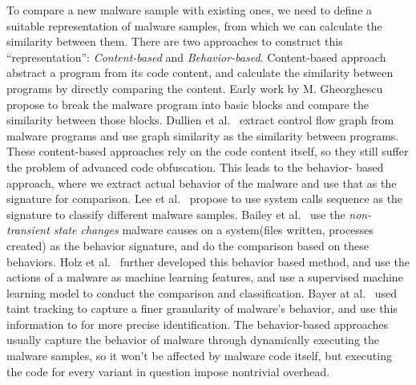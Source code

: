 To compare a new malware sample with existing ones, we need to define a 
suitable representation of malware samples, from which we can calculate 
the similarity between them. There are two approaches to construct this 
``representation'': \textit{Content-based} and \textit{Behavior-based}. 
Content-based approach abstract a program from its code content, and 
calculate the similarity between programs by directly comparing the 
content. Early work by M. Gheorghescu~\cite{Gheorghescu2006ANAV} propose 
to break the malware program into basic blocks and compare the similarity 
between those blocks.
Dullien et al.~\cite{dullien2005graph} extract control flow graph from 
malware programs and use graph similarity as the similarity between programs.
These content-based approaches rely on the code content itself, so they still
suffer the problem of advanced code obfuscation. This leads to the behavior-
based approach, where we extract actual behavior of the malware and use that
as the signature for comparison. Lee et al.~\cite{lee2006behavioral} propose
to use system calls sequence as the signature to classify different malware
samples. Bailey et al.~\cite{bailey2007automated} use the \textit{non-transient
state changes} malware causes on a system(files written, processes created) as 
the behavior signature, and do the comparison based on these behaviors. Holz 
et al.~\cite{rieck2008learning} further developed this behavior based method, 
and use the actions of a malware as machine learning features, and use a 
supervised machine learning model to conduct the comparison and classification.
Bayer at al.~\cite{bayer2009scalable} used taint tracking to capture a finer
granularity of malware's behavior, and use this information to for more precise
identification. The behavior-based approaches usually capture the behavior of
malware through dynamically executing the malware samples, so it won't be 
affected by malware code itself, but executing the code for every variant in
question impose nontrivial overhead. 

